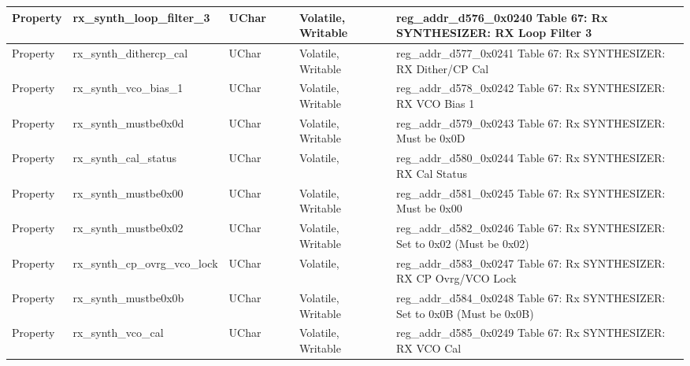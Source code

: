 \documentclass{article}
\begin{document}
\begin{scriptsize}
\begin{longtable}{|p{2cm}|p{5cm}|p{1cm}|p{2cm}|p{2cm}|p{1.75cm}|p{1.5cm}|p{5.1cm}|}
  \hline
  Property & rx\_synth\_loop\_filter\_3                               & UChar &                  &                  & Volatile,  Writable &         & reg\_addr\_d576\_0x0240 Table 67: Rx SYNTHESIZER: RX Loop Filter 3 \\
  \hline
  Property & rx\_synth\_dithercp\_cal                                 & UChar &                  &                  & Volatile,  Writable &         & reg\_addr\_d577\_0x0241 Table 67: Rx SYNTHESIZER: RX Dither/CP Cal \\
  \hline
  Property & rx\_synth\_vco\_bias\_1                                  & UChar &                  &                  & Volatile,  Writable &         & reg\_addr\_d578\_0x0242 Table 67: Rx SYNTHESIZER: RX VCO Bias 1 \\
  \hline
  Property & rx\_synth\_mustbe0x0d                                    & UChar &                  &                  & Volatile,  Writable &         & reg\_addr\_d579\_0x0243 Table 67: Rx SYNTHESIZER: Must be 0x0D \\
  \hline
  Property & rx\_synth\_cal\_status                                   & UChar &                  &                  & Volatile,           &         & reg\_addr\_d580\_0x0244 Table 67: Rx SYNTHESIZER: RX Cal Status \\
  \hline
  Property & rx\_synth\_mustbe0x00                                    & UChar &                  &                  & Volatile,  Writable &         & reg\_addr\_d581\_0x0245 Table 67: Rx SYNTHESIZER: Must be 0x00 \\
  \hline
  Property & rx\_synth\_mustbe0x02                                    & UChar &                  &                  & Volatile,  Writable &         & reg\_addr\_d582\_0x0246 Table 67: Rx SYNTHESIZER: Set to 0x02 (Must be 0x02) \\
  \hline
  Property & rx\_synth\_cp\_ovrg\_vco\_lock                           & UChar &                  &                  & Volatile,           &         & reg\_addr\_d583\_0x0247 Table 67: Rx SYNTHESIZER: RX CP Ovrg/VCO Lock \\
  \hline
  Property & rx\_synth\_mustbe0x0b                                    & UChar &                  &                  & Volatile,  Writable &         & reg\_addr\_d584\_0x0248 Table 67: Rx SYNTHESIZER: Set to 0x0B (Must be 0x0B) \\
  \hline
  Property & rx\_synth\_vco\_cal                                      & UChar &                  &                  & Volatile,  Writable &         & reg\_addr\_d585\_0x0249 Table 67: Rx SYNTHESIZER: RX VCO Cal \\

\end{longtable}
\end{scriptsize}
\end{document}
